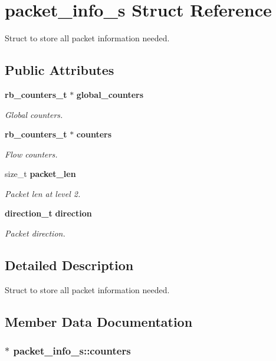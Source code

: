 \section{packet\_info\_s Struct Reference}
\label{structpacket__info__s}


Struct to store all packet information needed.  


\subsection*{Public Attributes}
\begin{DoxyCompactItemize}
\item 
{\bf rb\_counters\_t} $\ast$ {\bf global\_counters}
\begin{DoxyCompactList}\small\item\em Global counters. \end{DoxyCompactList}\item 
{\bf rb\_counters\_t} $\ast$ {\bf counters}
\begin{DoxyCompactList}\small\item\em Flow counters. \end{DoxyCompactList}\item 
size\_t {\bf packet\_len}
\begin{DoxyCompactList}\small\item\em Packet len at level 2. \end{DoxyCompactList}\item 
{\bf direction\_t} {\bf direction}
\begin{DoxyCompactList}\small\item\em Packet direction. \end{DoxyCompactList}\end{DoxyCompactItemize}


\subsection{Detailed Description}
Struct to store all packet information needed. 

\subsection{Member Data Documentation}
\subsubsection[{counters}]{$\ast$ packet\_info\_s\+::counters}\label{structpacket__info__s_af735e249b83dc2855bad3eb823c770be}


